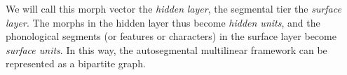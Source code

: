 
We will call this morph vector the \emph{hidden} \emph{layer}, 
the segmental tier the \emph{surface} \emph{layer}. The morphs 
in the hidden layer thus become \emph{hidden units}, and the phonological segments (or features or characters)
in the surface layer become \emph{surface units}.
In this way, the autosegmental multilinear framework can be 
represented as a bipartite graph.




